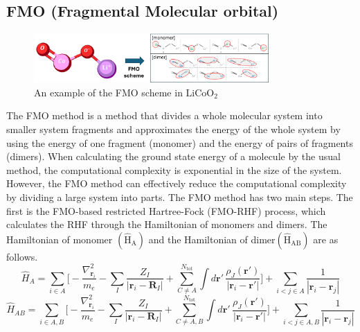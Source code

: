 \documentclass[pdflatex,sn-mathphys-num]{sn-jnl}%
\theoremstyle{thmstyleone}%
\theoremstyle{thmstyletwo}%
\theoremstyle{thmstylethree}%
\begin{document}


\subsection{FMO (Fragmental Molecular orbital)}\label{subsec2.3}
\begin{figure}[H]
\centering
\includegraphics[width=0.8\textwidth]{fig/LiCoO2_FMO.png}
\caption{An example of the FMO scheme in \(\mathrm{LiCoO_2}\)}\label{Fig.4}
\end{figure}
The FMO method is a method that divides a whole molecular system into smaller system fragments and approximates the energy of the whole system by using the energy of one fragment (monomer) and the energy of pairs of fragments (dimers). When calculating the ground state energy of a molecule by the usual method, the computational complexity is exponential in the size of the system. However, the FMO method can effectively reduce the computational complexity by dividing a large system into parts. 
The FMO method has two main steps. The first is the FMO-based restricted Hartree-Fock (FMO-RHF) process, which calculates the RHF through the Hamiltonian of monomers and dimers. The Hamiltonian of monomer \(\mathrm{(\hat{H}_{A})}\) and the Hamiltonian of dimer\(\mathrm{(\hat{H}_{AB})}\) are as follows. 
\begin{equation}
\hat{H}_A = 
\sum_{i \in A} \Bigg[
    -\frac{\nabla_{\mathbf{r}_i}^2}{m_e}
    - \sum_I \frac{Z_I}{|\mathbf{r}_i - \mathbf{R}_I|}
    + \sum_{C \neq A}^{N_{\mathrm{tot}}} 
      \int d\mathbf{r}' \, \frac{\rho_J(\mathbf{r}')}{|\mathbf{r}_i - \mathbf{r}'|}
\Bigg]
+ \sum_{i<j \in A} \frac{1}{|\mathbf{r}_i - \mathbf{r}_j|}\label{eq5}
\end{equation}
\begin{equation}
\hat{H}_{AB} = 
\sum_{i \in A,B} \Bigg[
    -\frac{\nabla_{\mathbf{r}_i}^2}{m_e}
    - \sum_I \frac{Z_I}{|\mathbf{r}_i - \mathbf{R}_I|}
    + \sum_{C \neq A,B}^{N_{\mathrm{tot}}} 
      \int d\mathbf{r}' \, \frac{\rho_J(\mathbf{r}')}{|\mathbf{r}_i - \mathbf{r}'|}
\Bigg] + \sum_{i<j \in A,B} \frac{1}{|\mathbf{r}_i - \mathbf{r}_j|}
\end{equation}
\end{document}

